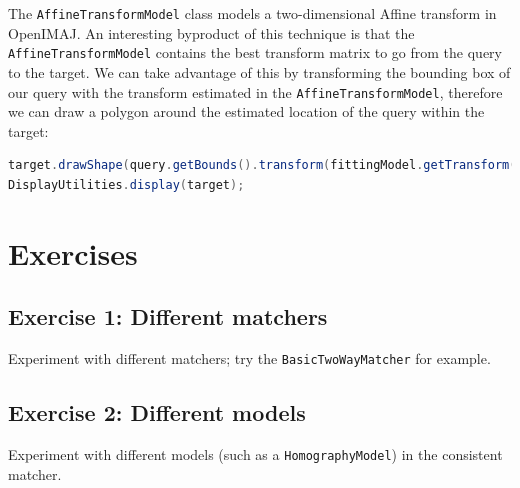 The \verb+AffineTransformModel+ class models a two-dimensional Affine transform in OpenIMAJ. An interesting 
byproduct of this technique is that the \verb+AffineTransformModel+ contains the best transform matrix 
to go from the query to the target. We can take advantage of this by transforming the bounding box of 
our query with the transform estimated in the \verb+AffineTransformModel+, therefore we can draw a 
polygon around the estimated location of the query within the target:
\begin{lstlisting}[language=java]
target.drawShape(query.getBounds().transform(fittingModel.getTransform().inverse()), 3,RGBColour.BLUE);
DisplayUtilities.display(target); 
\end{lstlisting}

\section*{Exercises}
\subsection*{Exercise 1: Different matchers}
Experiment with different matchers; try the \verb+BasicTwoWayMatcher+ for example.

\subsection*{Exercise 2: Different models}
Experiment 
with different models (such as a \verb+HomographyModel+) in the consistent matcher. 

